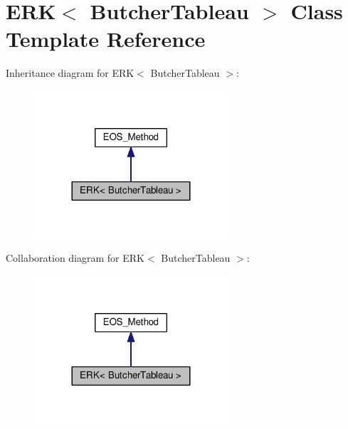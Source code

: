 \hypertarget{classERK}{}\section{E\+RK$<$ Butcher\+Tableau $>$ Class Template Reference}
\label{classERK}


Inheritance diagram for E\+RK$<$ Butcher\+Tableau $>$\+:\nopagebreak
\begin{figure}[H]
\begin{center}
\leavevmode
\includegraphics[width=204pt]{classERK__inherit__graph}
\end{center}
\end{figure}


Collaboration diagram for E\+RK$<$ Butcher\+Tableau $>$\+:\nopagebreak
\begin{figure}[H]
\begin{center}
\leavevmode
\includegraphics[width=204pt]{classERK__coll__graph}
\end{center}
\end{figure}
